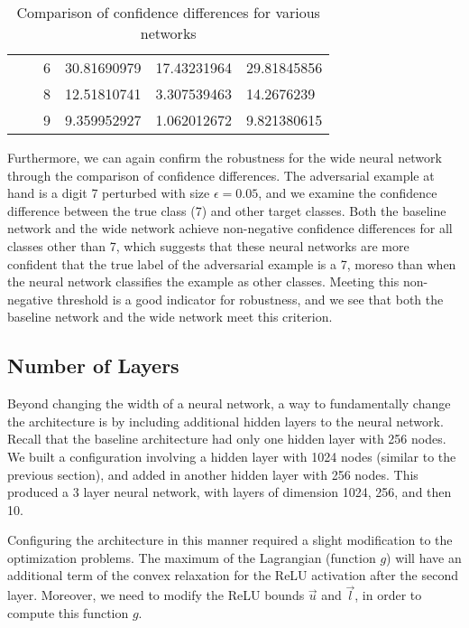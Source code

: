 \documentclass{article}
\begin{document}
\begin{table}[h]
\begin{tabular}{|l|l|l|l|l|l|}
                              &                       & 6     & 30.81690979 & 17.43231964 & 29.81845856  \\ \cline{3-6} 
                              &                       & 8     & 12.51810741 & 3.307539463 & 14.2676239   \\ \cline{3-6} 
                              &                       & 9     & 9.359952927 & 1.062012672 & 9.821380615  \\ \hline
\end{tabular}
\caption{Comparison of confidence differences for various networks}
\end{table}

Furthermore, we can again confirm the robustness for the wide neural network through the comparison 
of confidence differences. The adversarial example at hand is a digit 7 perturbed with size $\epsilon
= 0.05$, and we examine the confidence difference between the true class (7) and other target classes.
Both the baseline network and the wide network achieve non-negative confidence differences for all
classes other than 7, which suggests that these neural networks are more confident that the true 
label of the adversarial example is a 7, moreso than when the neural network classifies the example 
as other classes. Meeting this non-negative threshold is a good indicator for robustness, and we see
that both the baseline network and the wide network meet this criterion.

\subsection{Number of Layers}

Beyond changing the width of a neural network, a way to fundamentally change the architecture is by
including additional hidden layers to the neural network. Recall that the baseline architecture had
only one hidden layer with 256 nodes. We built a configuration involving a hidden layer with 1024 
nodes (similar to the previous section), and added in another hidden layer with 256 nodes. This
produced a 3 layer neural network, with layers of dimension 1024, 256, and then 10. 

Configuring the architecture in this manner required a slight modification to the optimization 
problems. The maximum of the Lagrangian (function $g$) will have an additional term of the convex 
relaxation for the ReLU activation after the second layer. Moreover, we need to modify the ReLU 
bounds $\vec{u}$ and $\vec{l}$, in order to compute this function $g$.
\end{document}
